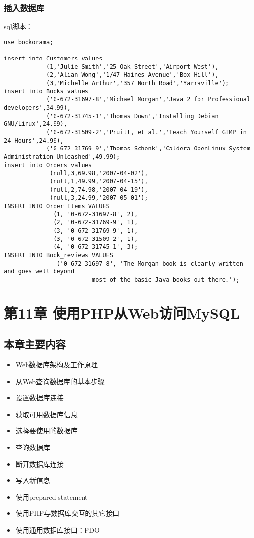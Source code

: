 \documentclass[11pt]{article}
\begin{document}
\subsubsection{插入数据库}
\label{sec:orgba1f73c}
sql脚本：
\begin{verbatim}
use bookorama;

insert into Customers values
			(1,'Julie Smith','25 Oak Street','Airport West'),
			(2,'Alian Wong','1/47 Haines Avenue','Box Hill'),
			(3,'Michelle Arthur','357 North Road','Yarraville');
insert into Books values
		    ('0-672-31697-8','Michael Morgan','Java 2 for Professional developers',34.99),
		    ('0-672-31745-1','Thomas Down','Installing Debian GNU/Linux',24.99),
		    ('0-672-31509-2','Pruitt, et al.','Teach Yourself GIMP in 24 Hours',24.99),
		    ('0-672-31769-9','Thomas Schenk','Caldera OpenLinux System Administration Unleashed',49.99);
insert into Orders values
		     (null,3,69.98,'2007-04-02'),
		     (null,1,49.99,'2007-04-15'),
		     (null,2,74.98,'2007-04-19'),
		     (null,3,24.99,'2007-05-01');
INSERT INTO Order_Items VALUES
			  (1, '0-672-31697-8', 2),
			  (2, '0-672-31769-9', 1),
			  (3, '0-672-31769-9', 1),
			  (3, '0-672-31509-2', 1),
			  (4, '0-672-31745-1', 3);
INSERT INTO Book_reviews VALUES
			   ('0-672-31697-8', 'The Morgan book is clearly written and goes well beyond
					     most of the basic Java books out there.');

\end{verbatim}
\section{第11章 使用PHP从Web访问MySQL}
\label{sec:org1169b7e}
\subsection{本章主要内容}
\label{sec:orgd77aac6}
\begin{itemize}
\item Web数据库架构及工作原理
\item 从Web查询数据库的基本步骤
\item 设置数据库连接
\item 获取可用数据库信息
\item 选择要使用的数据库
\item 查询数据库
\item 断开数据库连接
\item 写入新信息
\item 使用prepared statement
\item 使用PHP与数据库交互的其它接口
\item 使用通用数据库接口：PDO
\end{itemize}
\end{document}

